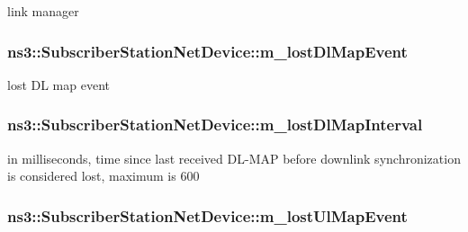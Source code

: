 link manager 

\subsubsection[{\texorpdfstring{m\+\_\+lost\+Dl\+Map\+Event}{m_lostDlMapEvent}}]{ ns3\+::\+Subscriber\+Station\+Net\+Device\+::m\+\_\+lost\+Dl\+Map\+Event\hspace{0.3cm}{\ttfamily [private]}}\hypertarget{classns3_1_1SubscriberStationNetDevice_ab31d06096944d8a14e8b3cdea766b7dd}{}\label{classns3_1_1SubscriberStationNetDevice_ab31d06096944d8a14e8b3cdea766b7dd}


lost DL map event 

\subsubsection[{\texorpdfstring{m\+\_\+lost\+Dl\+Map\+Interval}{m_lostDlMapInterval}}]{ ns3\+::\+Subscriber\+Station\+Net\+Device\+::m\+\_\+lost\+Dl\+Map\+Interval\hspace{0.3cm}{\ttfamily [private]}}\hypertarget{classns3_1_1SubscriberStationNetDevice_a1a53a29f53c265f0f0e95efe12c23bf3}{}\label{classns3_1_1SubscriberStationNetDevice_a1a53a29f53c265f0f0e95efe12c23bf3}


in milliseconds, time since last received D\+L-\/\+M\+AP before downlink synchronization is considered lost, maximum is 600 

\subsubsection[{\texorpdfstring{m\+\_\+lost\+Ul\+Map\+Event}{m_lostUlMapEvent}}]{ ns3\+::\+Subscriber\+Station\+Net\+Device\+::m\+\_\+lost\+Ul\+Map\+Event\hspace{0.3cm}{\ttfamily [private]}}\hypertarget{classns3_1_1SubscriberStationNetDevice_afc6403e6c18d6504b99f94968007548e}{}\label{classns3_1_1SubscriberStationNetDevice_afc6403e6c18d6504b99f94968007548e}



